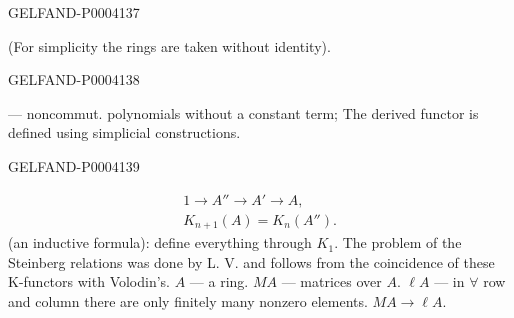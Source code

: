 \begin{GelfandAdjacentEvidence}{GELFAND-P000413}{7}


(For simplicity the rings are taken without identity).
\end{GelfandAdjacentEvidence}
\begin{GelfandAdjacentEvidence}{GELFAND-P000413}{8}


— noncommut. polynomials without a constant term;
The derived functor is defined using simplicial constructions.
\end{GelfandAdjacentEvidence}
\begin{GelfandAdjacentEvidence}{GELFAND-P000413}{9}


\begingroup\color{black}\begin{gather*}
1\longrightarrow A''\longrightarrow A'\longrightarrow A,\\
K_{n+1}(A)=K_n (A'').
\end{gather*}\endgroup
(an inductive formula): define everything through $K_1$.
The problem of the Steinberg relations was done by L. V. and follows from the coincidence of these K-functors with Volodin's.
$A$ — a ring.
$MA$ — matrices over $A$.
$\ell A$ — in $\forall$ row and column there are only finitely many nonzero elements.
$MA\longrightarrow\ell A$.
\end{GelfandAdjacentEvidence}



